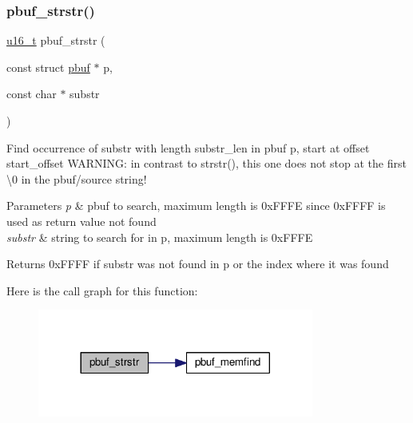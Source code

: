 \subsubsection{\texorpdfstring{pbuf\+\_\+strstr()}{pbuf\_strstr()}}
{\footnotesize\ttfamily \hyperlink{group__compiler__abstraction_ga77570ac4fcab86864fa1916e55676da2}{u16\+\_\+t} pbuf\+\_\+strstr (\begin{DoxyParamCaption}\item[{const struct \hyperlink{structpbuf}{pbuf} $\ast$}]{p,  }\item[{const char $\ast$}]{substr }\end{DoxyParamCaption})}

Find occurrence of substr with length substr\+\_\+len in pbuf p, start at offset start\+\_\+offset W\+A\+R\+N\+I\+NG\+: in contrast to strstr(), this one does not stop at the first \textbackslash{}0 in the pbuf/source string!


\begin{DoxyParams}{Parameters}
{\em p} & pbuf to search, maximum length is 0x\+F\+F\+FE since 0x\+F\+F\+FF is used as return value \textquotesingle{}not found\textquotesingle{} \\
\hline
{\em substr} & string to search for in p, maximum length is 0x\+F\+F\+FE \\
\hline
\end{DoxyParams}
\begin{DoxyReturn}{Returns}
0x\+F\+F\+FF if substr was not found in p or the index where it was found 
\end{DoxyReturn}
Here is the call graph for this function\+:
\nopagebreak
\begin{figure}[H]
\begin{center}
\leavevmode
\includegraphics[width=257pt]{openmote-cc2538_2lwip_2src_2core_2pbuf_8c_a9ba3f7b705309ceadb147692fd5a1c7d_cgraph}
\end{center}
\end{figure}
